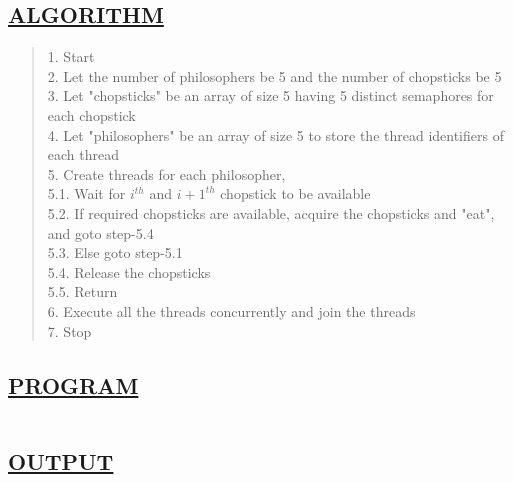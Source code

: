 \documentclass[a4paper, 12pt]{article}
\begin{document}
\subsection*{\underline{ALGORITHM}}
\begin{quote}
1. Start\\
2. Let the number of philosophers be 5 and the number of chopsticks be 5\\
3. Let "chopsticks" be an array of size 5 having 5 distinct semaphores for each chopstick\\
4. Let "philosophers" be an array of size 5 to store the thread identifiers of each thread\\
5. Create threads for each philosopher,\\
\hspace*{1cm} 5.1. Wait for $i^{th}$ and ${i+1}^{th}$ chopstick to be available\\
\hspace*{1cm} 5.2. If required chopsticks are available, acquire the chopsticks and "eat", and goto \hspace*{2cm} step-5.4\\
\hspace*{1cm} 5.3. Else goto step-5.1\\
\hspace*{1cm} 5.4. Release the chopsticks\\
\hspace*{1cm} 5.5. Return\\
6. Execute all the threads concurrently and join the threads\\
7. Stop
\end{quote}

\subsection*{\underline{PROGRAM}}
\begin{quote}
\inputminted[fontsize=\small,breaklines,breakanywhere]{c}{dining_philosophers.c}
\end{quote}

\newpage
\subsection*{\underline{OUTPUT}}

\begin{figure}[H] 
    \centering
\end{figure}
\end{document}
